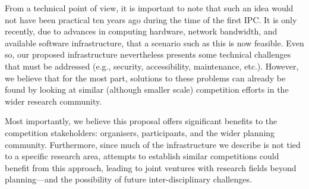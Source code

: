 From a technical point of view, it is important to note that such an
idea would not have been practical ten years ago during the time of
the first IPC. It is only recently, due to advances in computing
hardware, network bandwidth, and available software infrastructure,
that a scenario such as this is now feasible. Even so, our proposed
infrastructure nevertheless presents some technical challenges that
must be addressed (e.g., security, accessibility, maintenance,
etc.). However, we believe that for the most part, solutions to these
problems can already be found by looking at similar (although smaller
scale) competition efforts in the wider research community.

Most importantly, we believe this proposal offers significant benefits to
the competition stakeholders: organisers, participants, and the wider
planning community. Furthermore, since much of the infrastructure we
describe is not tied to a specific research area, attempts to establish
similar competitions could benefit from this approach, leading to joint
ventures with research fields beyond planning---and the
possibility of future inter-disciplinary challenges.




